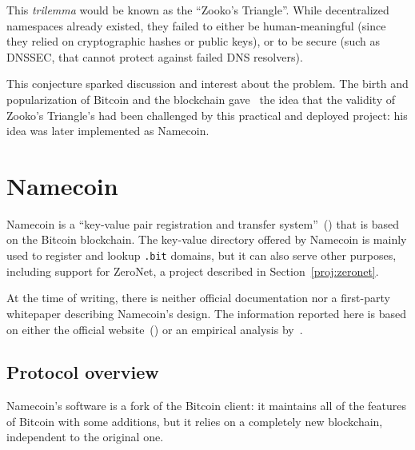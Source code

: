 \documentclass[mscthesis]{usiinfthesis}
\begin{document}
This \textit{trilemma} would be known as the ``Zooko's Triangle''. While decentralized namespaces already existed, they failed to either be human-meaningful (since they relied on cryptographic hashes or public keys), or to be secure (such as DNSSEC, that cannot protect against failed DNS resolvers).

This conjecture sparked discussion and interest about the problem. The birth and popularization of Bitcoin and the blockchain gave~\cite{swartz2011names} the idea that the validity of Zooko's Triangle's had been challenged by this practical and deployed project: his idea was later implemented as Namecoin.

\section{Namecoin}\label{proj:namecoin}

Namecoin is a ``key-value pair registration and transfer system''~(\cite{namecoin}) that is based on the Bitcoin blockchain.
The key-value directory offered by Namecoin is mainly used to register and lookup \texttt{.bit} domains, but it can also serve other purposes, including support for ZeroNet, a project described in Section~\ref{proj:zeronet}.

At the time of writing, there is neither official documentation nor a first-party whitepaper describing Namecoin's design. The information reported here is based on either the official website~(\cite{namecoin}) or an empirical analysis by~\cite{kalodner2015empirical}.

\subsection{Protocol overview}\label{sec:namecoindesc}
Namecoin's software is a fork of the Bitcoin client: it maintains all of the features of Bitcoin with some additions, but it relies on a completely new blockchain, independent to the original one.
\end{document}
